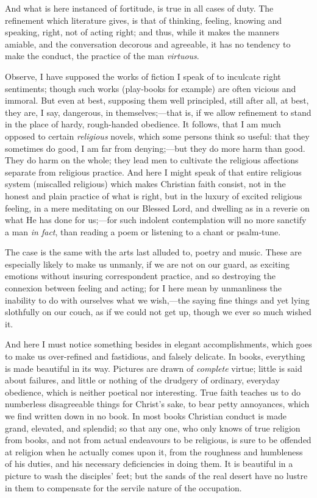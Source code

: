 And what is here instanced of fortitude, is true in all cases of
duty. The refinement which literature gives, is that of thinking,
feeling, knowing and speaking, right, not of acting right; and thus,
while it makes the manners amiable, and the conversation decorous and
agreeable, it has no tendency to make the conduct, the practice of the
man \emph{virtuous}.

Observe, I have supposed the works of fiction I speak of to inculcate
right sentiments; though such works (play-books for example) are often
vicious and immoral. But even at best, supposing them well principled,
still after all, at best, they are, I say, dangerous, in themselves;—that
is, if we allow refinement to stand in the place of hardy, rough-handed
obedience. It follows, that I am much opposed to certain \emph{religious}
novels, which some persons think so useful: that they sometimes do good,
I am far from denying;—but they do more harm than good. They do harm
on the whole; they lead men to cultivate the religious affections
separate from religious practice. And here I might speak of that entire
religious system (miscalled religious) which makes Christian faith
consist, not in the honest and plain practice of what is right, but in
the luxury of excited religious feeling, in a mere meditating on our
Blessed Lord, and dwelling as in a reverie on what He has done for us;—for
such indolent contemplation will no more sanctify a man \emph{in fact},
than reading a poem or listening to a chant or psalm-tune.

The case is the same with the arts last alluded to, poetry and music.
These are especially likely to make us unmanly, if we are not on our
guard, as exciting emotions without insuring correspondent practice, and
so destroying the connexion between feeling and acting; for I here mean
by unmanliness the inability to do with ourselves what we wish,—the
saying fine things and yet lying slothfully on our couch, as if we could
not get up, though we ever so much wished it.

And here I must notice something besides in elegant accomplishments,
which goes to make us over-refined and fastidious, and falsely delicate.
In books, everything is made beautiful in its way. Pictures are drawn of
\emph{complete} virtue; little is said about failures, and little or
nothing of the drudgery of ordinary, everyday obedience, which is
neither poetical nor interesting. True faith teaches us to do numberless
disagreeable things for Christ's sake, to bear petty annoyances, which
we find written down in no book. In most books Christian conduct is made
grand, elevated, and splendid; so that any one, who only knows of true
religion from books, and not from actual endeavours to be religious, is
sure to be offended at religion when he actually comes upon it, from the
roughness and humbleness of his duties, and his necessary deficiencies
in doing them. It is beautiful in a picture to wash the disciples' feet;
but the sands of the real desert have no lustre in them to compensate
for the servile nature of the occupation.

